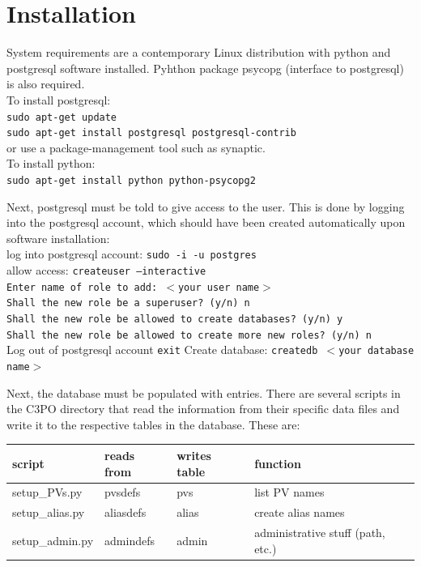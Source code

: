 \documentclass[10pt]{revtex4}
\begin{document}
\section{Installation}
\label{s_inst}
System requirements are a contemporary Linux distribution with python
and postgresql software installed. Pyhthon package psycopg
(interface to postgresql) is also required.\\
To install postgresql:\\
{\tt sudo apt-get update}\\
{\tt sudo apt-get install postgresql postgresql-contrib}\\
or use a package-management tool such as synaptic.\\
To install python:\\
{\tt sudo apt-get install python python-psycopg2}
\par
Next, postgresql must be told to give access to the user.
This is done by logging into the postgresql account, which should have
been created automatically upon software installation:\\
log into postgresql account: {\tt sudo -i -u postgres}\\
allow access: {\tt createuser --interactive}\\
{\tt Enter name of role to add: $<$your user name$>$\\
Shall the new role be a superuser? (y/n) n\\
Shall the new role be allowed to create databases? (y/n) y\\
Shall the new role be allowed to create more new roles? (y/n) n\\
}
Log out of postgresql account {\tt exit}
Create database: {\tt createdb $<$your database name$>$}
\par
Next, the database must be populated with entries.
There are several scripts in the C3PO directory that read the
information from their specific data files and write it to the
respective tables in the database.
These are:\par
\begin{tabular}{|llll|}
\hline
script & reads from & writes table & function \\
\hline
\hline
setup\_PVs.py & pvsdefs & pvs & list PV names\\
setup\_alias.py & aliasdefs & alias & create alias names\\
setup\_admin.py & admindefs & admin & administrative stuff (path, etc.)\\

\hline
\end{tabular}
\end{document}
